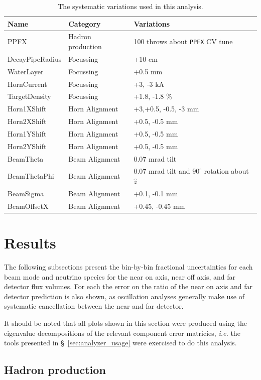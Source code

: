 \documentclass{article}
\begin{document}
\begin{table}
\centering
\begin{tabular}{l|l|l}
Name & Category & Variations \\
\hline
PPFX & Hadron production & 100 throws about \texttt{PPFX} CV tune \\
\hline
DecayPipeRadius & Focussing & +10 cm \\
WaterLayer & Focussing & +0.5 mm \\
HornCurrent & Focussing & +3, -3 kA \\
TargetDensity & Focussing & +1.8, -1.8 \% \\
\hline
Horn1XShift & Horn Alignment & +3,+0.5, -0.5, -3 mm\\
Horn2XShift & Horn Alignment & +0.5, -0.5 mm \\
Horn1YShift & Horn Alignment & +0.5, -0.5 mm \\
Horn2YShift & Horn Alignment & +0.5, -0.5 mm \\
\hline
BeamTheta & Beam Alignment & 0.07 mrad tilt \\
BeamThetaPhi & Beam Alignment & 0.07 mrad tilt and $90^{\circ}$ rotation about $\hat{z}$ \\
BeamSigma & Beam Alignment & +0.1, -0.1 mm \\
BeamOffsetX & Beam Alignment & +0.45, -0.45 mm \\
\end{tabular}
\caption{The systematic variations used in this analysis.}
\label{tbl:uncertdefn}
\end{table}

\section{Results}

The following subsections present the bin-by-bin fractional uncertainties for each beam mode and neutrino species for the near on axis, near off axis, and far detector flux volumes. For each the error on the ratio of the near on axis and far detector prediction is also shown, as oscillation analyses generally make use of systematic cancellation between the near and far detector.

It should be noted that all plots shown in this section were produced using the eigenvalue decompositions of the relevant component error matricies, \textit{i.e.} the tools presented in \S~\ref{sec:analyzer_usage} were exercised to do this analysis.

\subsection{Hadron production}
\end{document}
